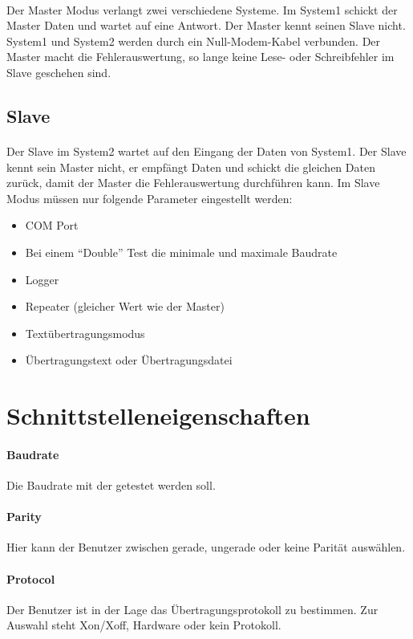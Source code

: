\paragraph{}
Der Master Modus verlangt zwei verschiedene Systeme. Im System1 schickt der Master Daten und wartet auf eine Antwort. Der Master kennt seinen Slave nicht. System1 und System2 werden durch ein Null-Modem-Kabel verbunden. Der Master macht die Fehlerauswertung, so lange keine Lese- oder Schreibfehler im Slave geschehen sind.


\subsection{Slave}
\paragraph{}
Der Slave im System2 wartet auf den Eingang der Daten von System1. Der Slave kennt sein Master nicht, er empfängt Daten und schickt die gleichen Daten zurück, damit der Master die Fehlerauswertung durchführen kann. Im Slave Modus müssen nur folgende Parameter eingestellt werden:

\begin{itemize}
\item COM Port
\item Bei einem "`Double"' Test die minimale und maximale Baudrate
\item Logger
\item Repeater (gleicher Wert wie der Master)
\item Textübertragungsmodus
\item Übertragungstext oder Übertragungsdatei
\end{itemize}


\section{Schnittstelleneigenschaften}

\paragraph{Baudrate} Die Baudrate mit der getestet werden soll.
\paragraph{Parity} Hier kann der Benutzer zwischen gerade, ungerade oder keine Parität auswählen.
\paragraph{Protocol} Der Benutzer ist in der Lage das Übertragungsprotokoll zu bestimmen. Zur Auswahl steht Xon/Xoff, Hardware oder kein Protokoll.
